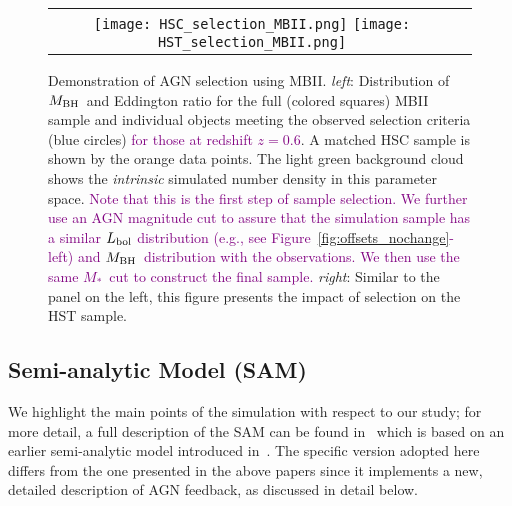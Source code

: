 \documentclass[twocolumn]{aastex631}
\newcommand{\todo}[1]{\textcolor{red}{[{\bf TODO}: #1]}}
\newcommand{\red}[1]{\textcolor{purple}{#1}}
\def\smass{{$M_*$}}
\def\mbh{$M_{\rm BH}$}
\begin{document}
\begin{figure*}
\centering
\begin{tabular}{c c}
{\texttt{[image: HSC\_selection\_MBII.png]}}
{\texttt{[image: HST\_selection\_MBII.png]}}
\end{tabular}
\caption{\label{fig:selection}Demonstration of AGN selection using MBII. {\it left}: Distribution of \mbh\ and Eddington ratio for the full (colored squares) MBII sample and individual objects meeting the observed selection criteria (blue circles) \red{for those at redshift $z=0.6$}. A matched HSC sample is shown by the orange data points. The light green background cloud shows the {\it intrinsic} simulated number density in this parameter space. \red{Note that this is the first step of sample selection. We further use an AGN magnitude cut to assure that the simulation sample has a similar $L_{\rm bol}$ distribution (e.g., see Figure~\ref{fig:offsets_nochange}-left) and \mbh\ distribution with the observations. We then use the same \smass\ cut to construct the final sample.}
{\it right}: Similar to the panel on the left, this figure presents the impact of selection on the HST sample.
}
\end{figure*}

\subsection{Semi-analytic Model (SAM)}\label{subsec:SAM}
We highlight the main points of the simulation with respect to our study; for more detail, a full description of the SAM can be found in~\citet{Menci2016} which is based on an earlier semi-analytic model introduced in~\citet{Menci2014}. The specific version adopted here differs from the one presented in the above papers since it implements a new, detailed description of AGN feedback, as discussed in detail below.
\end{document}
